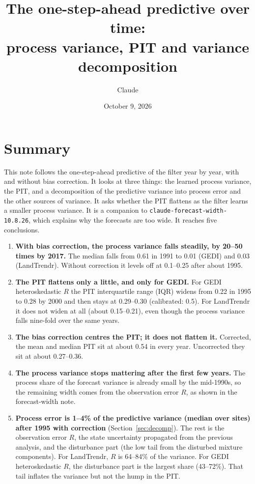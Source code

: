 \documentclass[11pt]{article}
\title{The one-step-ahead predictive over time:\\ process variance, PIT and variance decomposition}
\author{Claude}
\date{October 9, 2026}
\newcommand{\code}[1]{\texttt{#1}}
\begin{document}
\maketitle

\section*{Summary}

This note follows the one-step-ahead predictive of the filter year by year, with and without
bias correction. It looks at three things: the learned process variance, the PIT, and a decomposition of the
predictive variance into process error and the other sources of variance. It asks whether
the PIT flattens as the filter learns a smaller process variance. It is a companion to
\code{claude-forecast-width-10.8.26}, which explains why the forecasts are too wide. It
reaches five conclusions.

\begin{enumerate}
  \item \textbf{With bias correction, the process variance falls steadily, by 20--50 times by 2017.} The median
  falls from 0.61 in 1991 to 0.01 (GEDI) and 0.03 (LandTrendr). Without correction it levels off at
  0.1--0.25 after about 1995.
  \item \textbf{The PIT flattens only a little, and only for GEDI.} For GEDI heteroskedastic
  $R$ the PIT interquartile range (IQR) widens from 0.22 in 1995 to 0.28 by 2000 and then stays at 0.29--0.30
  (calibrated: 0.5). For LandTrendr it does not widen at all (about 0.15--0.21), even though the
  process variance falls nine-fold over the same years.
  \item \textbf{The bias correction centres the PIT; it does not flatten it.} Corrected, the mean and median
  PIT sit at about 0.54 in every year. Uncorrected they sit at about 0.27--0.36.
  \item \textbf{The process variance stops mattering after the first few years.} The process share of the forecast variance
  is already small by the mid-1990s, so the remaining width comes from the
  observation error $R$, as shown in the forecast-width note.
  \item \textbf{Process error is 1--4\% of the predictive variance (median over sites) after 1995 with
  correction} (Section~\ref{sec:decomp}). The rest is the observation error $R$, the
  state uncertainty propagated from the previous analysis, and the disturbance part (the low tail
  from the disturbed mixture components). For LandTrendr, $R$ is 64--84\% of the
  variance. For GEDI heteroskedastic $R$, the disturbance part is the largest share (43--72\%).
  That tail inflates the variance but not the hump in the PIT.
\end{enumerate}
\end{document}
